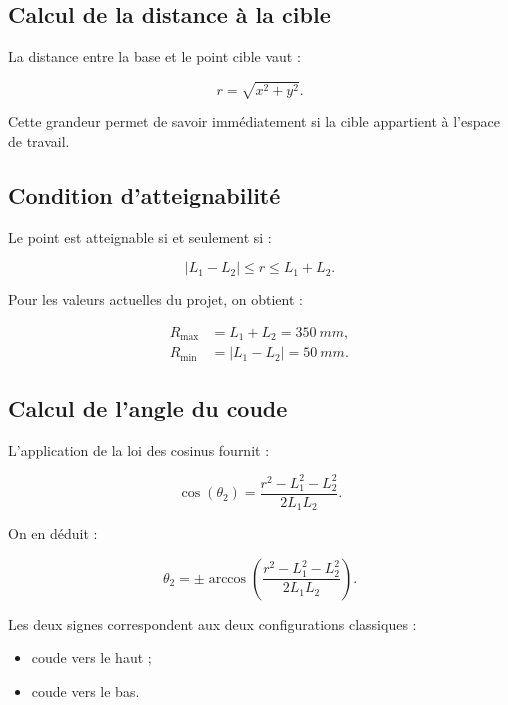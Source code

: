 \documentclass[12pt,a4paper]{report}
\newcommand{\Lone}{L_1}
\newcommand{\Ltwo}{L_2}
\newcommand{\thtwo}{\theta_2}
\newcommand{\workspace}{espace de travail}
\begin{document}
\subsection{Calcul de la distance à la cible}

La distance entre la base et le point cible vaut :

\begin{equation}
    r = \sqrt{x^2 + y^2}.
\end{equation}

Cette grandeur permet de savoir immédiatement si la cible appartient à l'\workspace{}.

\subsection{Condition d'atteignabilité}

Le point est atteignable si et seulement si :

\begin{equation}
    |\Lone - \Ltwo| \leq r \leq \Lone + \Ltwo.
\end{equation}

Pour les valeurs actuelles du projet, on obtient :

\begin{align}
    R_{\max} &= \Lone + \Ltwo = \SI{350}{mm}, \\
    R_{\min} &= |\Lone - \Ltwo| = \SI{50}{mm}.
\end{align}

\subsection{Calcul de l'angle du coude}

L'application de la loi des cosinus fournit :

\begin{equation}
    \cos(\thtwo) = \frac{r^2 - \Lone^2 - \Ltwo^2}{2 \Lone \Ltwo}.
\end{equation}

On en déduit :

\begin{equation}
    \thtwo = \pm \arccos\left(\frac{r^2 - \Lone^2 - \Ltwo^2}{2 \Lone \Ltwo}\right).
\end{equation}

Les deux signes correspondent aux deux configurations classiques :

\begin{itemize}
    \item coude vers le haut ;
    \item coude vers le bas.
\end{itemize}
\end{document}
